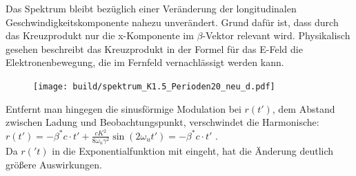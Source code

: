 \documentclass[11pt,a4paper]{article}
\begin{document}
\begin{itemize}
			Das Spektrum bleibt bezüglich einer Veränderung der longitudinalen Geschwindigkeitskomponente nahezu unverändert. Grund dafür ist, dass durch das Kreuzprodukt nur die x-Komponente im $\beta$-Vektor relevant wird. 
			Physikalisch gesehen beschreibt das Kreuzprodukt in der Formel für das E-Feld die Elektronenbewegung, die im Fernfeld vernachlässigt werden kann.  

			\begin{figure}[H]
				\centering
				\texttt{[image: build/spektrum\_K1.5\_Perioden20\_neu\_d.pdf]}
			\end{figure}

			Entfernt man hingegen die sinusförmige Modulation bei $r(t\prime )$, dem Abstand zwischen Ladung und Beobachtungspunkt, verschwindet die Harmonische: \\
			$r(t\prime ) = - \beta^{*} c \cdot t\prime  + \frac{cK^2}{8\omega_{u} \gamma^2}\sin(2\omega_{u} t\prime) = - \beta^{*} c \cdot t\prime  $ . \\
			Da $r(\prime t)$ in die Exponentialfunktion mit eingeht, hat die Änderung deutlich größere Auswirkungen.
 
		\end{itemize}
\end{document}
